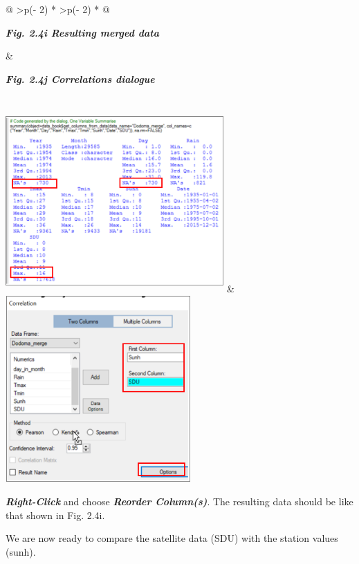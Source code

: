 \documentclass[
  letterpaper,
  DIV=11,
  numbers=noendperiod]{scrreprt}
\begin{document}
\begin{longtable}[]{@{}
  >{\centering\arraybackslash}p{(\columnwidth - 2\tabcolsep) * }
  >{\centering\arraybackslash}p{(\columnwidth - 2\tabcolsep) * }@{}}
\toprule\noalign{}
\begin{minipage}[b]{\linewidth}\centering
\textbf{\emph{Fig. 2.4i Resulting merged data}}
\end{minipage} & \begin{minipage}[b]{\linewidth}\centering
\textbf{\emph{Fig. 2.4j Correlations dialogue}}
\end{minipage} \\
\midrule\noalign{}
\endhead
\bottomrule\noalign{}
\endlastfoot
\includegraphics[width=3.285in,height=2.76in]{figures/Fig2.4g.png} &
\includegraphics[width=2.792in,height=2.812in]{figures/Fig2.4j.png} \\
\end{longtable}

\textbf{\emph{Right-Click}} and choose \textbf{\emph{Reorder
Column(s)}}. The resulting data should be like that shown in Fig. 2.4i.

We are now ready to compare the satellite data (SDU) with the station
values (sunh).
\end{document}

